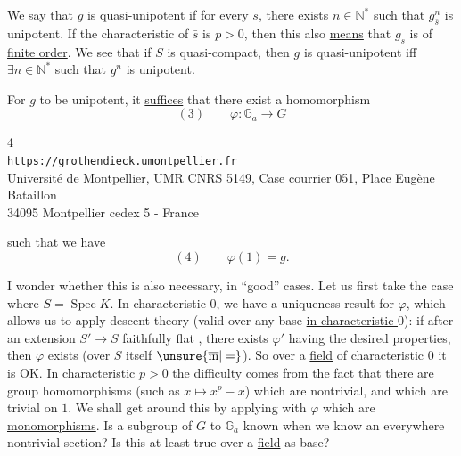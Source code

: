 We say that $g$ is quasi-unipotent if for every $\bar s$, there exists
$n\in\mathbb N^*$ such that $g_{\bar s}^{n}$ is unipotent.
If the characteristic of $\bar s$ is $p>0$, then this also \uline{means} that
$g_{\bar s}$ is of \uline{finite order}. We see that if $S$ is
quasi-compact, then $g$ is quasi-unipotent iff
$\exists n\in\mathbb N^*$ such that $g^n$ is unipotent.


 For $g$ to be unipotent, it \uline{suffices} that there exist a homomorphism
\[
(3)\qquad \varphi:\mathbb G_a\longrightarrow G
\]

\begin{center}
\small
4\\
\texttt{https://grothendieck.umontpellier.fr}\\
Université de Montpellier, UMR CNRS 5149, Case courrier 051, Place Eugène Bataillon\\
34095 Montpellier cedex 5 - France
\end{center}


such that we have
\[
(4)\qquad \varphi(1)=g.
\]

I wonder whether this is also necessary, in ``good'' cases. Let us first take the
case where $S=\operatorname{Spec}K$. In characteristic $0$, we have a uniqueness
result for $\varphi$, which allows us to apply descent theory
(valid over any base \uline{in characteristic $0$}): if after an extension
$S'\longrightarrow S$ faithfully flat , there exists $\varphi'$ having
the desired properties, then $\varphi$ exists
(over $S$ itself $\unsure{\overline{\mathrm m}|=}$).
So over a \uline{field} of characteristic $0$ it is OK. In characteristic $p>0$ the difficulty
comes from the fact that there are group homomorphisms
(such as $x\mapsto x^p-x$) which are  nontrivial, and which are
trivial on $1$. We shall get around this  by applying
 with $\varphi$ which are \uline{monomorphisms}.
 
Is a subgroup of $G$  to $\mathbb G_a$ known when
we know an everywhere nontrivial section? Is this at least true over a
\uline{field} as base?

